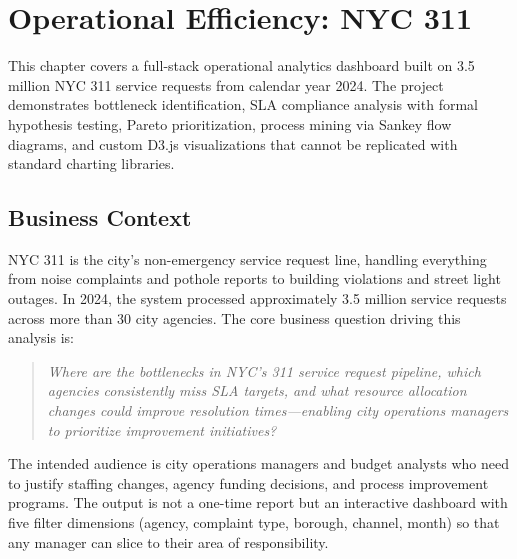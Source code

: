 
\chapter{Operational Efficiency: NYC 311}
\label{ch:operations}

\begin{keyinsight}
This chapter covers a full-stack operational analytics dashboard built on 3.5 million NYC 311 service requests from calendar year 2024. The project demonstrates bottleneck identification, SLA compliance analysis with formal hypothesis testing, Pareto prioritization, process mining via Sankey flow diagrams, and custom D3.js visualizations that cannot be replicated with standard charting libraries.
\end{keyinsight}

\section{Business Context}
\label{sec:ops-business-context}


NYC 311 is the city's non-emergency service request line, handling everything from noise complaints and pothole reports to building violations and street light outages. In 2024, the system processed approximately 3.5 million service requests across more than 30 city agencies. The core business question driving this analysis is:

\begin{quote}
\textit{Where are the bottlenecks in NYC's 311 service request pipeline, which agencies consistently miss SLA targets, and what resource allocation changes could improve resolution times---enabling city operations managers to prioritize improvement initiatives?}
\end{quote}

The intended audience is city operations managers and budget analysts who need to justify staffing changes, agency funding decisions, and process improvement programs. The output is not a one-time report but an interactive dashboard with five filter dimensions (agency, complaint type, borough, channel, month) so that any manager can slice to their area of responsibility.

